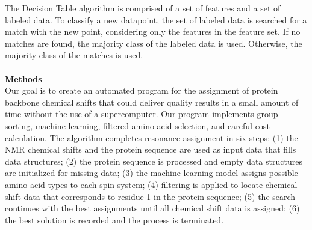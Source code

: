 \documentclass{article}
\begin{document}
The Decision Table algorithm \cite{decisiontable_algorithm} is comprised of a set of features and a set of labeled data. To classify a new datapoint, the set of labeled data is searched for a match with the new point, considering only the features in the feature set. If no matches are found, the majority class of the labeled data is used. Otherwise, the majority class of the matches is used.
\\\\
\noindent\textbf {Methods}\\
Our goal is to create an automated program for the assignment of protein backbone chemical shifts that could deliver quality results in a small amount of time without the use of a supercomputer. Our program implements group sorting, machine learning, filtered amino acid selection, and careful cost calculation. The algorithm completes resonance assignment in six steps: (1) the NMR chemical shifts and the protein sequence are used as input data that fills data structures; (2) the protein sequence is processed and empty data structures are initialized for missing data; (3) the machine learning model assigns possible amino acid types to each spin system; (4) filtering is applied to locate chemical shift data that corresponds to residue 1 in the protein sequence; (5) the search continues with the best assignments until all chemical shift data is assigned; (6) the best solution is recorded and the process is terminated. 
\end{document}
